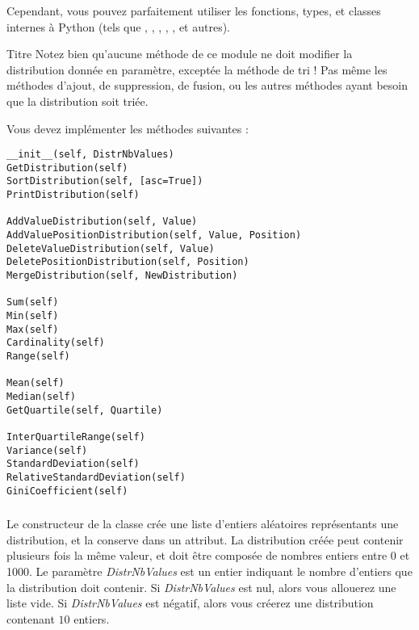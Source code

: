 \bigskip

\noindent Cependant, vous pouvez parfaitement utiliser les fonctions, types, et classes internes à Python (tels que , , , , , et autres).

\bigskip

\begin{RedBoxTitle}{Titre}
Notez bien qu'aucune méthode de ce module ne doit modifier la distribution donnée en paramètre, exceptée la méthode de tri !
Pas même les méthodes d'ajout, de suppression, de fusion, ou les autres méthodes ayant besoin que la distribution soit triée.
\end{RedBoxTitle}

\newpage

\noindent Vous devez implémenter les méthodes suivantes :

\bigskip

\lstset{language=python}
\begin{lstlisting}[frame=single,title={Liste des méthodes pour la classe de statistiques}]
__init__(self, DistrNbValues)
GetDistribution(self)
SortDistribution(self, [asc=True])
PrintDistribution(self)

AddValueDistribution(self, Value)
AddValuePositionDistribution(self, Value, Position)
DeleteValueDistribution(self, Value)
DeletePositionDistribution(self, Position)
MergeDistribution(self, NewDistribution)

Sum(self)
Min(self)
Max(self)
Cardinality(self)
Range(self)

Mean(self)
Median(self)
GetQuartile(self, Quartile)

InterQuartileRange(self)
Variance(self)
StandardDeviation(self)
RelativeStandardDeviation(self)
GiniCoefficient(self) \end{lstlisting}




\subsubsection*{}

\noindent Le constructeur de la classe crée une liste d'entiers aléatoires représentants une distribution, et la conserve dans un attribut.
La distribution créée peut contenir plusieurs fois la même valeur, et doit être composée de nombres entiers entre 0 et 1000.
Le paramètre \textit{DistrNbValues} est un entier indiquant le nombre d'entiers que la distribution doit contenir.
Si \textit{DistrNbValues} est nul, alors vous allouerez une liste vide.
Si \textit{DistrNbValues} est négatif, alors vous créerez une distribution contenant $ 10 $ entiers.


